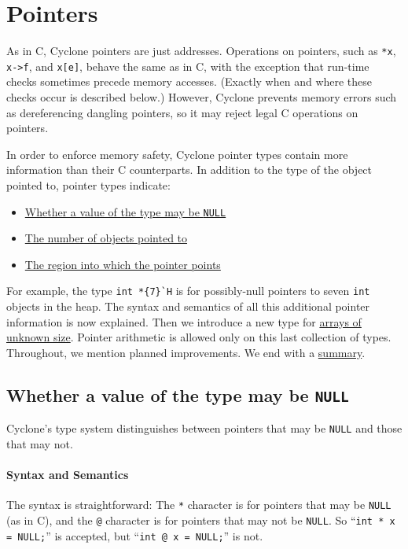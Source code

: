 \section{Pointers}
\label{sec:pointers}

As in C, Cyclone pointers are just addresses.  Operations on pointers,
such as \texttt{*x}, \texttt{x->f}, and \texttt{x[e]}, behave the same
as in C, with the exception that run-time checks sometimes precede
memory accesses.  (Exactly when and where these checks occur is
described below.)  However, Cyclone prevents memory errors such as
dereferencing dangling pointers, so it may reject legal C operations
on pointers.

In order to enforce memory safety, Cyclone pointer types contain more
information than their C counterparts.  In addition to the type of the
object pointed to, pointer types indicate:

\begin{itemize}
\item \hyperlink{pointer_null}{Whether a value of the type may be
    \texttt{NULL}}
\item \hyperlink{pointer_bound}{The number of objects pointed to}
\item \hyperlink{pointer_region}{The region into which the pointer
    points}
\end{itemize}

For example, the type \verb|int *{7}`H| is for possibly-null
pointers to seven \texttt{int} objects in the heap.  The syntax and
semantics of all this additional pointer information is now explained.
Then we introduce a new type for \hyperlink{pointer_unknown}{arrays of
  unknown size}.  Pointer arithmetic is allowed only on this last
collection of types.  Throughout, we mention planned improvements.  We
end with a \hyperlink{pointer_summary}{summary}.

\subsection*{\hypertarget{pointer_null}{Whether a value of the type may be
    \texttt{NULL}}}

Cyclone's type system distinguishes between pointers that may be
\texttt{NULL} and those that may not.

\paragraph{Syntax and Semantics} The syntax is straightforward:
The \texttt{*} character is for pointers that may be \texttt{NULL} (as in
C), and the \texttt{@} character is for pointers that may not be
\texttt{NULL}.  So ``\texttt{int * x = NULL;}'' is accepted, but
``\texttt{int @ x = NULL;}'' is not.


